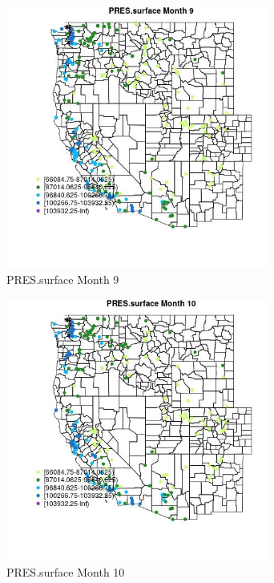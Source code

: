 \begin{figure} 
\centering  
\includegraphics[width=0.77\textwidth]{Code_Outputs/Report_ML_input_PM25_Step4_part_e_de_duplicated_aveswNAs_MapObsMo9PRESsurface.jpg} 
\caption{\label{fig:Report_ML_input_PM25_Step4_part_e_de_duplicated_aveswNAsMapObsMo9PRESsurface}PRES.surface Month 9} 
\end{figure} 
 

\begin{figure} 
\centering  
\includegraphics[width=0.77\textwidth]{Code_Outputs/Report_ML_input_PM25_Step4_part_e_de_duplicated_aveswNAs_MapObsMo10PRESsurface.jpg} 
\caption{\label{fig:Report_ML_input_PM25_Step4_part_e_de_duplicated_aveswNAsMapObsMo10PRESsurface}PRES.surface Month 10} 
\end{figure} 
 

